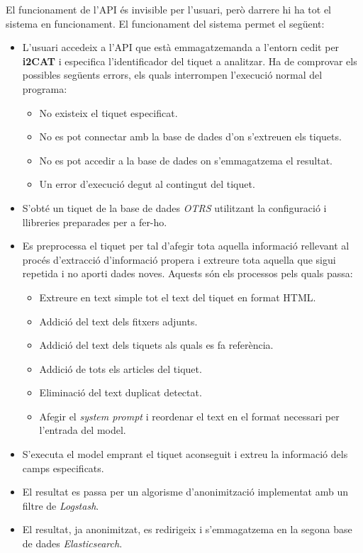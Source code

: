 El funcionament de l'API és invisible per l'usuari, però darrere hi ha tot el sistema en funcionament. El funcionament del sistema permet el següent: 
\begin{itemize}
    \item L'usuari accedeix a l'API que està emmagatzemanda a l'entorn cedit per \textbf{i2CAT} i especifica l'identificador del tiquet a analitzar. Ha de comprovar els possibles següents errors, els quals interrompen l'execució normal del programa:
    \begin{itemize}
        \item No existeix el tiquet especificat. 
        \item No es pot connectar amb la base de dades d'on s'extreuen els tiquets.
        \item No es pot accedir a la base de dades on s'emmagatzema el resultat.
        \item Un error d'execució degut al contingut del tiquet.
    \end{itemize}
    \item S'obté un tiquet de la base de dades \textit{OTRS} utilitzant la configuració i llibreries preparades per a fer-ho.
    \item Es preprocessa el tiquet per tal d'afegir tota aquella informació rellevant al procés d'extracció d'informació propera i extreure tota aquella que sigui repetida i no aporti dades noves. Aquests són els processos pels quals passa:
    \begin{itemize}
        \item Extreure en text simple tot el text del tiquet en format HTML.
        \item Addició del text dels fitxers adjunts.
        \item Addició del text dels tiquets als quals es fa referència.
        \item Addició de tots els articles del tiquet.
        \item Eliminació del text duplicat detectat.
        \item Afegir el \textit{system prompt} i reordenar el text en el format necessari per l'entrada del model.
    \end{itemize}
    \item S'executa el model emprant el tiquet aconseguit i extreu la informació dels camps especificats.
    \item El resultat es passa per un algorisme d'anonimització implementat amb un filtre de \textit{Logstash}.
    \item El resultat, ja anonimitzat, es redirigeix i s'emmagatzema en la segona base de dades \textit{Elasticsearch}.
\end{itemize}


